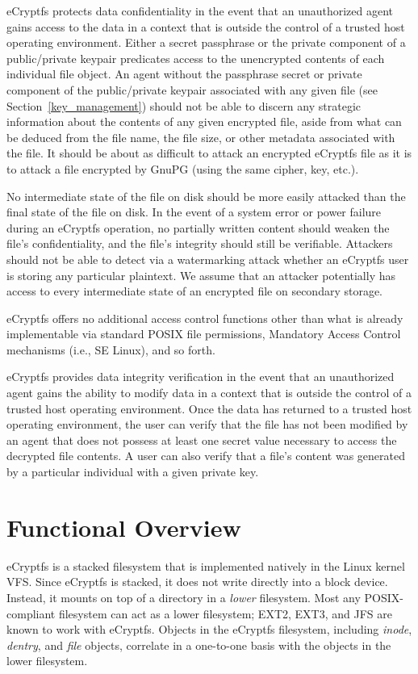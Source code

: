 \documentclass{article}
\begin{document}
eCryptfs protects data confidentiality in the event that an
unauthorized agent gains access to the data in a context that is
outside the control of a trusted host operating environment. Either a
secret passphrase or the private component of a public/private keypair
predicates access to the unencrypted contents of each individual file
object. An agent without the passphrase secret or private component of
the public/private keypair associated with any given file (see
Section~\ref{key_management}) should not be able to discern any
strategic information about the contents of any given encrypted file,
aside from what can be deduced from the file name, the file size, or
other metadata associated with the file. It should be about as
difficult to attack an encrypted eCryptfs file as it is to attack a
file encrypted by GnuPG (using the same cipher, key, etc.).

No intermediate state of the file on disk should be more easily
attacked than the final state of the file on disk. In the event of a
system error or power failure during an eCryptfs operation, no
partially written content should weaken the file's confidentiality,
and the file's integrity should still be verifiable. Attackers should
not be able to detect via a watermarking attack whether an eCryptfs
user is storing any particular plaintext. We assume that an attacker
potentially has access to every intermediate state of an encrypted
file on secondary storage.

eCryptfs offers no additional access control functions other than what
is already implementable via standard POSIX file permissions,
Mandatory Access Control mechanisms (i.e., SE Linux), and so forth.

eCryptfs provides data integrity verification in the event that an
unauthorized agent gains the ability to modify data in a context that
is outside the control of a trusted host operating environment. Once
the data has returned to a trusted host operating environment, the
user can verify that the file has not been modified by an agent that
does not possess at least one secret value necessary to access the
decrypted file contents. A user can also verify that a file's content
was generated by a particular individual with a given private key.

\section{Functional Overview}

eCryptfs is a stacked filesystem that is implemented natively in the
Linux kernel VFS. Since eCryptfs is stacked, it does not write
directly into a block device. Instead, it mounts on top of a directory
in a \emph{lower} filesystem. Most any POSIX-compliant filesystem can
act as a lower filesystem; EXT2, EXT3, and JFS are known to work with
eCryptfs. Objects in the eCryptfs filesystem, including \emph{inode},
\emph{dentry}, and \emph{file} objects, correlate in a one-to-one
basis with the objects in the lower filesystem.
\end{document}
